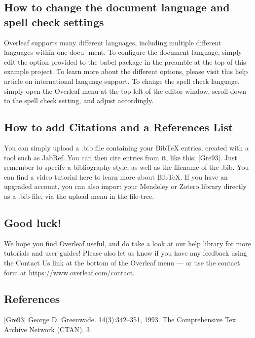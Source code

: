 \documentclass{article}
\begin{document}
\subsection{How to change the document language and spell check settings}
Overleaf supports many different languages, including multiple different languages within one docu-
ment.
To configure the document language, simply edit the option provided to the babel package in the
preamble at the top of this example project. To learn more about the different options, please visit
this help article on international language support.
To change the spell check language, simply open the Overleaf menu at the top left of the editor
window, scroll down to the spell check setting, and adjust accordingly.
\subsection{How to add Citations and a References List}
You can simply upload a .bib file containing your BibTeX entries, created with a tool such as JabRef.
You can then cite entries from it, like this: [Gre93]. Just remember to specify a bibliography style, as
well as the filename of the .bib. You can find a video tutorial here to learn more about BibTeX.
If you have an upgraded account, you can also import your Mendeley or Zotero library directly as
a .bib file, via the upload menu in the file-tree.
\subsection{Good luck!}
We hope you find Overleaf useful, and do take a look at our help library for more tutorials and user
guides! Please also let us know if you have any feedback using the Contact Us link at the bottom of
the Overleaf menu — or use the contact form at https://www.overleaf.com/contact.
\subsection{References}
[Gre93] George D. Greenwade.
	14(3):342–351, 1993.
	The Comprehensive Tex Archive Network (CTAN).
	3
\end{document}

